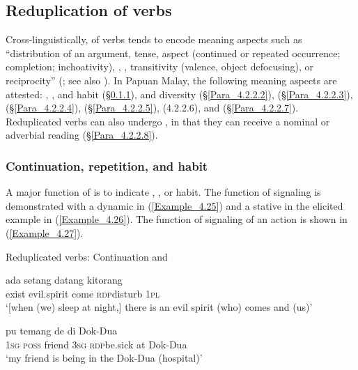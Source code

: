 \z

\subsection{Reduplication of verbs}
\label{Para_4.2.2}
Cross-linguistically,  of verbs tends to encode meaning aspects such as “distribution of an argument, tense, aspect (continued or repeated occurrence; completion; inchoativity), , , transitivity (valence, object defocusing), or reciprocity” (\citealt{Rubino.2013}; see also \citealt[561]{Wiltshire.1978}). In Papuan Malay, the following meaning aspects are attested: , , and habit (§\ref{Para_4.2.2.1}),  and diversity (§\ref{Para_4.2.2.2}),  (§\ref{Para_4.2.2.3}),  (§\ref{Para_4.2.2.4}),  (§\ref{Para_4.2.2.5}),  (4.2.2.6), and  (§\ref{Para_4.2.2.7}). Reduplicated verbs can also undergo , in that they can receive a nominal or adverbial reading (§\ref{Para_4.2.2.8}).


\subsubsection[Continuation, {repetition}, and habit]{Continuation, {repetition}, and habit}
\label{Para_4.2.2.1}
A major function of   is to indicate , , or habit. The function of signaling  is demonstrated with a dynamic  in (\ref{Example_4.25}) and a stative  in the elicited example in (\ref{Example_4.26}). The function of signaling  of an action is shown in (\ref{Example_4.27}).


\begin{styleExampleTitle}
Reduplicated verbs: Continuation and 
\end{styleExampleTitle}
\ea
\label{Example_4.25}
\gll {\ldots} {ada} {setang} {datang} {} {kitorang}\\ %
 {}  exist  evil.spirit  come  \textsc{rdp}{\Tilde}disturb  \textsc{1pl}\\
\glt 
‘[when (we) sleep at night,] there is an evil spirit (who) comes and  (us)’ \textstyleExampleSource{[081006-022-CvEx.0168]}
\z

\ea
\label{Example_4.26}
 {pu} {temang} {de} {} {di} {Dok-Dua}\\ %
 \textsc{1sg}  \textsc{poss}  friend  \textsc{3sg}  \textsc{rdp}{\Tilde}be.sick  at  Dok-Dua\\
\glt 
‘my friend is being  in the Dok-Dua (hospital)’ \textstyleExampleSource{[Elicited BR120813.036]}
\z


